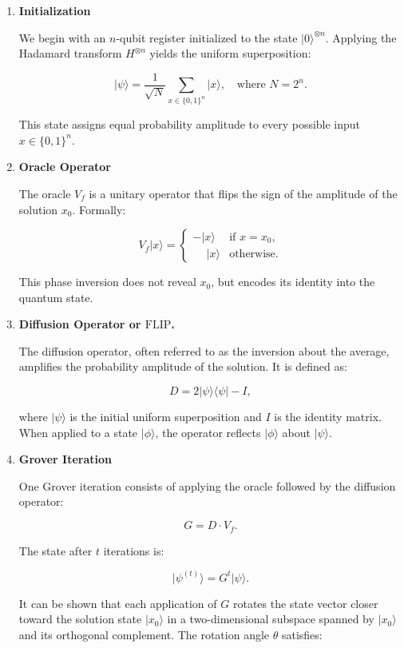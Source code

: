 \documentclass[12pt,a4paper,openany]{report}
\newcommand{\ket}[1]{\lvert #1 \rangle}
\newcommand{\bra}[1]{\langle #1 \rvert}
\begin{document}
\begin{enumerate}
    \item \textbf{Initialization}

    We begin with an \( n \)-qubit register initialized to the state \( \ket{0}^{\otimes n} \). Applying the Hadamard transform \( H^{\otimes n} \) yields the uniform superposition:

    \[
    \ket{\psi} = \frac{1}{\sqrt{N}} \sum_{x \in \{0,1\}^n} \ket{x}, \quad \text{where } N = 2^n.
    \]

    This state assigns equal probability amplitude to every possible input \( x \in \{0,1\}^n \).

    \item \textbf{Oracle Operator}

    The oracle \( V_f \) is a unitary operator that flips the sign of the amplitude of the solution \( x_0 \). Formally:

    \[
    V_f \ket{x} = 
    \begin{cases}
    - \ket{x} & \text{if } x = x_0, \\
    \phantom{-} \ket{x} & \text{otherwise}.
    \end{cases}
    \]

    This phase inversion does not reveal \( x_0 \), but encodes its identity into the quantum state.

   \item \textbf{Diffusion Operator or $\text{FLIP}_{*}$}

    The diffusion operator, often referred to as the inversion about the average, amplifies the probability amplitude of the solution. It is defined as:

    \[
    D = 2 \ket{\psi}\bra{\psi} - I,
    \]

    where \( \ket{\psi} \) is the initial uniform superposition and \( I \) is the identity matrix. When applied to a state \( \ket{\phi} \), the operator reflects \( \ket{\phi} \) about \( \ket{\psi} \).

    \item \textbf{Grover Iteration}

    One Grover iteration consists of applying the oracle followed by the diffusion operator:

    \[
    G = D \cdot V_f.
    \]

    The state after \( t \) iterations is:

    \[
    \ket{\psi^{(t)}} = G^t \ket{\psi}.
    \]

    It can be shown that each application of \( G \) rotates the state vector closer toward the solution state \( \ket{x_0} \) in a two-dimensional subspace spanned by \( \ket{x_0} \) and its orthogonal complement. The rotation angle \( \theta \) satisfies:


\end{enumerate}
\end{document}
